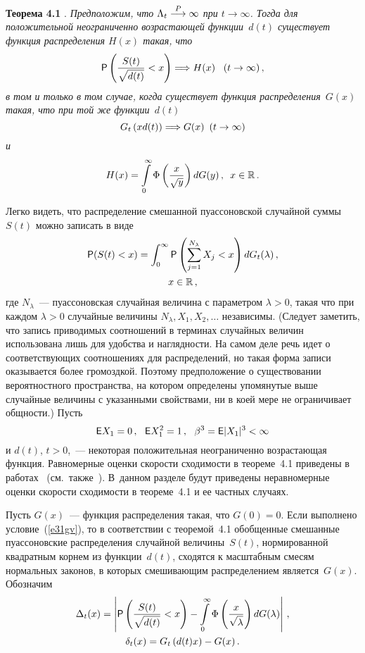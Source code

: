 \begin{multicols}{2}
\smallskip

\noindent
\textbf{Теорема 4.1} \cite{Korolev96, BenKor2002}. \textit{Предположим, что
$\Lambda_t\stackrel{P}{\longrightarrow}\infty$ при $t\to\infty$. Тогда для положительной
неограниченно возрастающей функции~$d(t)$ существует функция
распределения $H(x)$ такая, что}
$$
{\sf P}\left(\displaystyle\frac{\displaystyle S(t)\mathstrut}{\displaystyle \sqrt{d(t)}\mathstrut}<x\right)\Longrightarrow H(x)\
\enskip (t\to\infty)\,,
$$
\textit{в том и только в том случае, когда существует функция
распределения~$G(x)$ такая, что при той же функции~$d(t)$}
\begin{equation}
G_t\left(xd(t)\right)\Longrightarrow G(x) \enskip (t\to\infty)\label{e31gv}
\end{equation}
\textit{и}
$$
H(x)=\int\limits_{0}^{\infty}\Phi\left(\frac{x}{\sqrt{y}}\right)dG(y)\,,\enskip
x\in\mathbb R\,.
$$

\smallskip

Легко видеть, что распределение смешанной пуассоновской случайной
суммы~$S(t)$ можно записать в виде
\begin{multline}
{\sf P}(S(t)<x)=\int_{0}^{\infty}{\sf
P}\left(\sum_{j=1}^{N_{\lambda}}X_j<x\right)dG_t(\lambda)\,,\\
x\in\mathbb R\,,
\label{e32gv}
\end{multline}
где $N_\lambda$~--- пуассоновская случайная величина с параметром
$\lambda>0$, такая что при каждом $\lambda>0$ случайные величины
$N_\lambda,X_1,X_2,\ldots$ независимы. (Следует заметить, что запись
приводимых соотношений в терминах случайных величин использована
лишь для удобства и наглядности. На самом деле речь идет о
соответствующих соотношениях для распределений, но такая форма
записи оказывается более громоздкой. Поэтому предположение о
существовании вероятностного пространства, на котором определены
упомянутые выше случайные величины с указанными свойствами, ни в
коей мере не ограничивает общности.) Пусть
\begin{equation}
{\sf E}X_1=0\,,\ \ {\sf E}X_1^2=1\,,\ \ \beta^3={\sf
E}|X_1|^3<\infty\label{e33gv}
\end{equation}
и $d(t)$, $t>0$,~--- некоторая положительная неограниченно
возрастающая функция. Равномерные оценки скорости сходимости в
теореме~4.1 приведены в работах~\cite{KorolevBEs, KorSchev, Gavrilenko} (см.\ также~\cite{KorBenShorg}). 
В~данном разделе будут приведены неравномерные
оценки скорости сходимости в теореме~4.1 и ее частных случаях.

Пусть $G(x)$~--- функция распределения такая, что $G(0)=0$. Если
выполнено условие~(\ref{e31gv}), то в соответствии с теоремой~4.1
обобщенные смешанные пуассоновские распределения случайной
величины~$S(t)$, нормированной квадратным корнем из функции~$d(t)$, 
сходятся к масштабным смесям нормальных законов, в которых
смешивающим распределением является~$G(x)$. Обозначим
\begin{gather*}
\Delta_t(x)=\left|{\sf P}\left(\displaystyle\frac{\displaystyle S(t)\mathstrut}{\displaystyle \sqrt{d(t)}\mathstrut}<x\right)-
\int\limits_{0}^{\infty}
\Phi\left(\displaystyle\frac{\displaystyle x\mathstrut}{\displaystyle \sqrt{\lambda}\mathstrut}\right)dG(\lambda)\right|\,,\\
\delta_t(x)=G_t\left(d(t)x\right)-G(x)\,.
\end{gather*}


\end{multicols}
